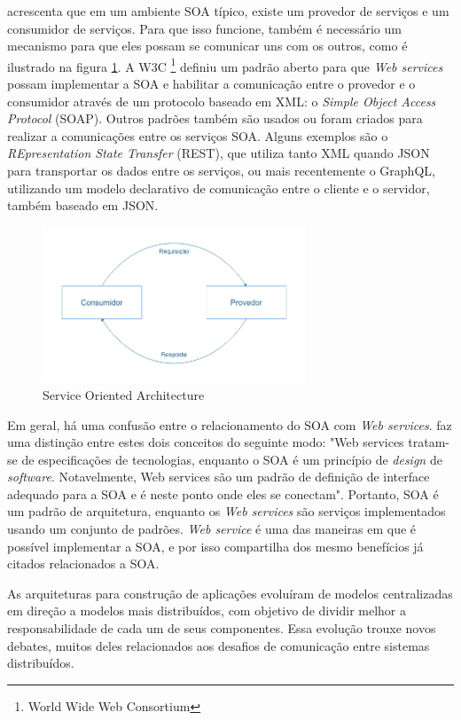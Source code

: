  acrescenta que em um ambiente SOA típico, existe um provedor de serviços e um consumidor de serviços. Para que isso funcione, também é necessário um mecanismo para que eles possam se comunicar uns com os outros, como é ilustrado na figura \ref{fig:soa}. A W3C \footnote{World Wide Web Consortium} definiu um padrão aberto para que \textit{Web services} possam implementar a SOA e habilitar a comunicação entre o provedor e o consumidor através de um protocolo baseado em XML: o \textit{Simple Object Access Protocol} (SOAP). Outros padrões também são usados ou foram criados para realizar a comunicações entre os serviços SOA. Alguns exemplos são o \textit{REpresentation State Transfer} (REST), que utiliza tanto XML quando JSON para transportar os dados entre os serviços, ou mais recentemente o GraphQL, utilizando um modelo declarativo de comunicação entre o cliente e o servidor, também baseado em JSON.

\begin{figure}[htbp]
    \centering
    \includegraphics[width=0.7\textwidth]{figuras/soa.png}
    \caption{Service Oriented Architecture}
    \label{fig:soa}
\end{figure}

Em geral, há uma confusão entre o relacionamento do SOA com \textit{Web services}.  faz uma distinção entre estes dois conceitos do seguinte modo: "Web services tratam-se de especificações de tecnologias, enquanto o SOA é um princípio de \textit{design} de \textit{software}. Notavelmente, Web services são um padrão de definição de interface adequado para a SOA e é neste ponto onde eles se conectam". Portanto, SOA é um padrão de arquitetura, enquanto os \textit{Web services} são serviços implementados usando um conjunto de padrões. \textit{Web service} é uma das maneiras em que é possível implementar a SOA, e por isso compartilha dos mesmo benefícios já citados relacionados a SOA.

As arquiteturas para construção de aplicações evoluíram de modelos centralizadas em direção a modelos mais distribuídos, com objetivo de dividir melhor a responsabilidade de cada um de seus componentes. Essa evolução trouxe novos debates, muitos deles relacionados aos desafios de comunicação entre sistemas distribuídos.